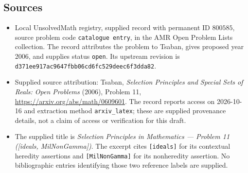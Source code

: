\documentclass[11pt]{article}
\begin{document}
\subsection{Sources}
\begin{itemize}
\item Local UnsolvedMath registry, supplied record with permanent ID \(800585\), source problem code \texttt{catalogue entry}, in the AMR Open Problem Lists collection. The record attributes the problem to Tsaban, gives proposed year 2006, and supplies status \texttt{open}. Its upstream revision is \texttt{d371ee917ac9647fbb06cd6fc529deec6f3dda82}.
\item Supplied source attribution: Tsaban, \emph{Selection Principles and Special Sets of Reals: Open Problems} (2006), Problem 11, \url{https://arxiv.org/abs/math/0609601}. The record reports access on 2026-10-16 and extraction method \texttt{arxiv\_latex}; these are supplied provenance details, not a claim of access or verification for this draft.
\item The supplied title is \emph{Selection Principles in Mathematics --- Problem 11 ([ideals, MilNonGamma])}. The excerpt cites \texttt{[ideals]} for its contextual heredity assertions and \texttt{[MilNonGamma]} for its nonheredity assertion. No bibliographic entries identifying those two reference labels are supplied.
\end{itemize}
\end{document}
